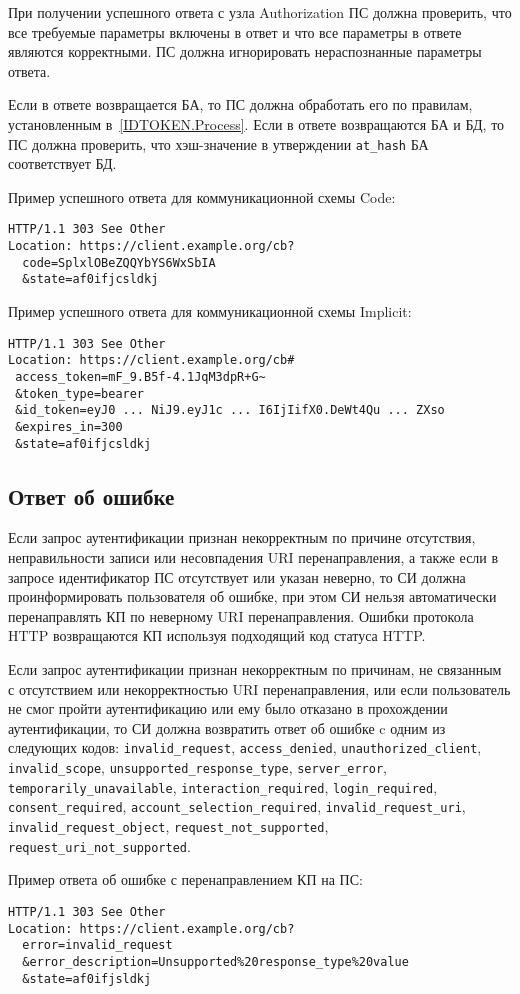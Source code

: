 При получении успешного ответа с узла Authorization ПС должна 
проверить, что все требуемые параметры включены в ответ
и что все параметры в ответе являются корректными.
%
ПС должна игнорировать нераспознанные параметры ответа.

Если в ответе возвращается БА, то ПС должна обработать его по правилам, 
установленным в~\ref{IDTOKEN.Process}. 
%
Если в ответе возвращаются БА и БД, то ПС должна проверить, что хэш-значение
в утверждении \lstinline{at_hash} БА соответствует БД.

Пример успешного ответа для коммуникационной схемы Code:
%
\begin{lstlisting}
HTTP/1.1 303 See Other
Location: https://client.example.org/cb?
  code=SplxlOBeZQQYbYS6WxSbIA
  &state=af0ifjcsldkj
\end{lstlisting}

Пример успешного ответа для коммуникационной схемы Implicit:
%
\begin{lstlisting}
HTTP/1.1 303 See Other
Location: https://client.example.org/cb#
 access_token=mF_9.B5f-4.1JqM3dpR+G~
 &token_type=bearer
 &id_token=eyJ0 ... NiJ9.eyJ1c ... I6IjIifX0.DeWt4Qu ... ZXso
 &expires_in=300
 &state=af0ifjcsldkj
\end{lstlisting}

\subsection{Ответ об ошибке}\label{REQRESP.Auth.Error}

Если запрос аутентификации признан некорректным по причине отсутствия,
неправильности записи или несовпадения URI перенаправления, а также если в
запросе идентификатор ПС отсутствует или указан неверно, то СИ должна
проинформировать пользователя об ошибке, при этом СИ нельзя автоматически
перенаправлять КП по неверному URI перенаправления. Ошибки протокола HTTP
возвращаются КП используя подходящий код статуса HTTP.

Если запрос аутентификации признан некорректным по причинам, не связанным с
отсутствием или некорректностью URI перенаправления, или если пользователь не
смог пройти аутентификацию или ему было отказано в прохождении аутентификации,
то СИ должна возвратить ответ об ошибке c одним из следующих кодов:
%
\lstinline{invalid_request}, 
\lstinline{access_denied},
\lstinline{unauthorized_client}, 
\lstinline{invalid_scope},
\lstinline{unsupported_response_type},
\lstinline{server_error}, 
\lstinline{temporarily_unavailable}, 
\lstinline{interaction_required},
\lstinline{login_required},
\lstinline{consent_required},
\lstinline{account_selection_required},
\lstinline{invalid_request_uri},
\lstinline{invalid_request_object},
\lstinline{request_not_supported}, 
\lstinline{request_uri_not_supported}. 

Пример ответа об ошибке с перенаправлением КП на ПС:
\begin{lstlisting}
HTTP/1.1 303 See Other
Location: https://client.example.org/cb?
  error=invalid_request
  &error_description=Unsupported%20response_type%20value
  &state=af0ifjsldkj
\end{lstlisting}



